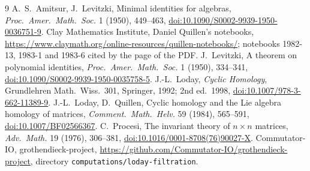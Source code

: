 \documentclass[11pt,a4paper]{amsart}
\theoremstyle{definition}
\theoremstyle{remark}
\begin{document}
\begin{thebibliography}{9}
 A.~S.~Amitsur, J.~Levitzki, Minimal identities for algebras, \emph{Proc.\ Amer.\ Math.\ Soc.} 1 (1950), 449--463, \href{https://doi.org/10.1090/S0002-9939-1950-0036751-9}{doi:10.1090/S0002-9939-1950-0036751-9}.
 Clay Mathematics Institute, Daniel Quillen's notebooks, \url{https://www.claymath.org/online-resources/quillen-notebooks/}; notebooks 1982-13, 1983-1 and 1983-6 cited by the page of the PDF.
 J.~Levitzki, A theorem on polynomial identities, \emph{Proc.\ Amer.\ Math.\ Soc.} 1 (1950), 334--341, \href{https://doi.org/10.1090/S0002-9939-1950-0035758-5}{doi:10.1090/S0002-9939-1950-0035758-5}.
 J.-L.~Loday, \emph{Cyclic Homology}, Grundlehren Math.\ Wiss.~301, Springer, 1992; 2nd ed.\ 1998, \href{https://doi.org/10.1007/978-3-662-11389-9}{doi:10.1007/978-3-662-11389-9}.
 J.-L.~Loday, D.~Quillen, Cyclic homology and the Lie algebra homology of matrices, \emph{Comment.\ Math.\ Helv.} 59 (1984), 565--591, \href{https://doi.org/10.1007/BF02566367}{doi:10.1007/BF02566367}.
 C.~Procesi, The invariant theory of $n \times n$ matrices, \emph{Adv.\ Math.} 19 (1976), 306--381, \href{https://doi.org/10.1016/0001-8708(76)90027-X}{doi:10.1016/0001-8708(76)90027-X}.
 Commutator-IO, grothendieck-project, \url{https://github.com/Commutator-IO/grothendieck-project}, directory \texttt{computations/loday-filtration}.
\end{thebibliography}
\end{document}

